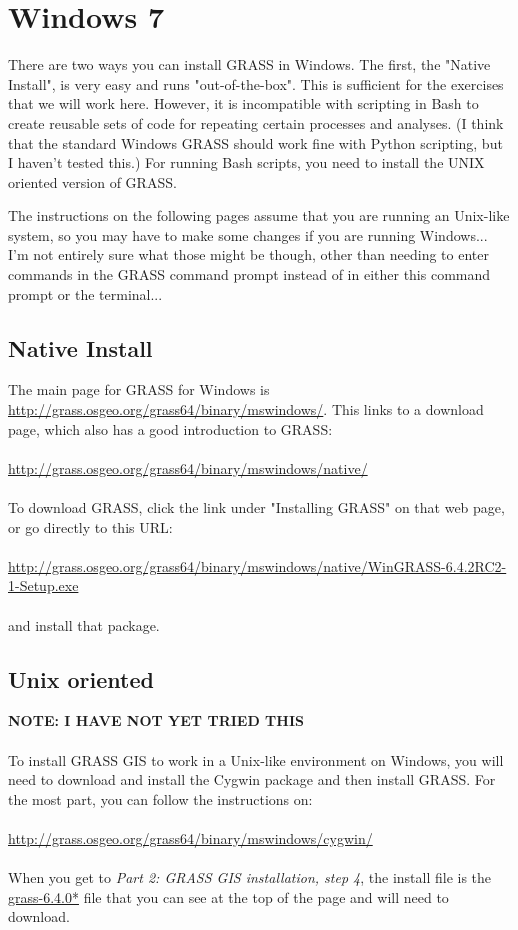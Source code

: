 \documentclass{book}
\begin{document}
\section{Windows 7}

There are two ways you can install GRASS in Windows. The first, the "Native Install", is very easy and runs "out-of-the-box". This is sufficient for the exercises that we will work here. However, it is incompatible with scripting in Bash to create reusable sets of code for repeating certain processes and analyses. (I think that the standard Windows GRASS should work fine with Python scripting, but I haven't tested this.) For running Bash scripts, you need to install the UNIX oriented version of GRASS.

The instructions on the following pages assume that you are running an Unix-like system, so you may have to make some changes if you are running Windows... I'm not entirely sure what those might be though, other than needing to enter commands in the GRASS command prompt instead of in either this command prompt or the terminal...

\subsection{Native Install}

The main page for GRASS for Windows is \url{http://grass.osgeo.org/grass64/binary/mswindows/}. This links to a download page, which also has a good introduction to GRASS: \\
\\
\url{http://grass.osgeo.org/grass64/binary/mswindows/native/}
\\ \\
To download GRASS, click the link under "Installing GRASS" on that web page, or go directly to this URL:
\\ \\
\url{http://grass.osgeo.org/grass64/binary/mswindows/native/WinGRASS-6.4.2RC2-1-Setup.exe}
\\ \\
and install that package.

\subsection{Unix oriented}

{\bf NOTE: I HAVE NOT YET TRIED THIS}
\\ \\
To install GRASS GIS to work in a Unix-like environment on Windows, you will need to download and install the Cygwin package and then install GRASS. For the most part, you can follow the instructions on:
\\ \\
\url{http://grass.osgeo.org/grass64/binary/mswindows/cygwin/}
\\ \\ 
When you get to \emph{Part 2: GRASS GIS installation, step 4}, the install file is the \url{grass-6.4.0*} file that you can see at the top of the page and will need to download.
\end{document}
